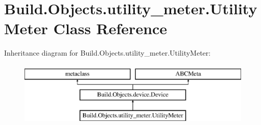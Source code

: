 \hypertarget{class_build_1_1_objects_1_1utility__meter_1_1_utility_meter}{}\section{Build.\+Objects.\+utility\+\_\+meter.\+Utility\+Meter Class Reference}
\label{class_build_1_1_objects_1_1utility__meter_1_1_utility_meter}
Inheritance diagram for Build.\+Objects.\+utility\+\_\+meter.\+Utility\+Meter\+:\begin{figure}[H]
\begin{center}
\leavevmode
\includegraphics[height=3.000000cm]{class_build_1_1_objects_1_1utility__meter_1_1_utility_meter}
\end{center}
\end{figure}
